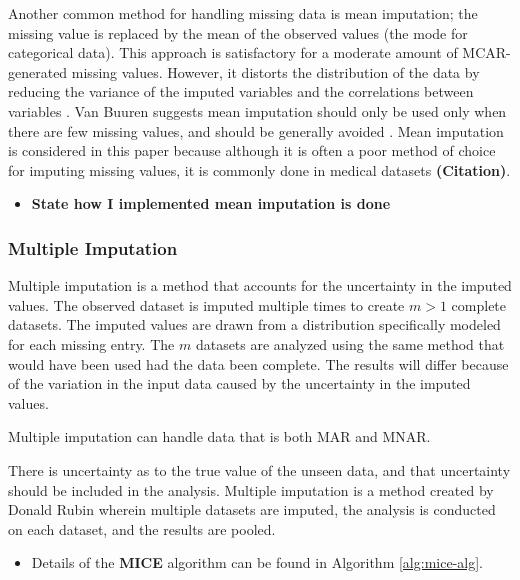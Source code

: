 \documentclass[12pt,]{article}
\providecommand{\tightlist}{%
  \setlength{\itemsep}{0pt}\setlength{\parskip}{0pt}}
\begin{document}
Another common method for handling missing data is mean imputation; the
missing value is replaced by the mean of the observed values (the mode
for categorical data). This approach is satisfactory for a moderate
amount of MCAR-generated missing values. However, it distorts the
distribution of the data by reducing the variance of the imputed
variables and the correlations between variables
\autocite{little_bayes_2014}. Van Buuren suggests mean imputation should
only be used only when there are few missing values, and should be
generally avoided \autocite{van_buuren_flexible_2012}. Mean imputation
is considered in this paper because although it is often a poor method
of choice for imputing missing values, it is commonly done in medical
datasets \textbf{(Citation)}.

\begin{itemize}
\tightlist
\item
  \textbf{State how I implemented mean imputation is done}
\end{itemize}

\subsubsection{Multiple Imputation}\label{multiple-imputation}

Multiple imputation is a method that accounts for the uncertainty in the
imputed values. The observed dataset is imputed multiple times to create
\(m>1\) complete datasets. The imputed values are drawn from a
distribution specifically modeled for each missing entry. The \(m\)
datasets are analyzed using the same method that would have been used
had the data been complete. The results will differ because of the
variation in the input data caused by the uncertainty in the imputed
values.

Multiple imputation can handle data that is both MAR and MNAR.

There is uncertainty as to the true value of the unseen data, and that
uncertainty should be included in the analysis. Multiple imputation is a
method created by Donald Rubin wherein multiple datasets are imputed,
the analysis is conducted on each dataset, and the results are pooled.

\begin{itemize}
\tightlist
\item
  Details of the \textbf{MICE} algorithm can be found in Algorithm
  \ref{alg:mice-alg}.
\end{itemize}
\end{document}
